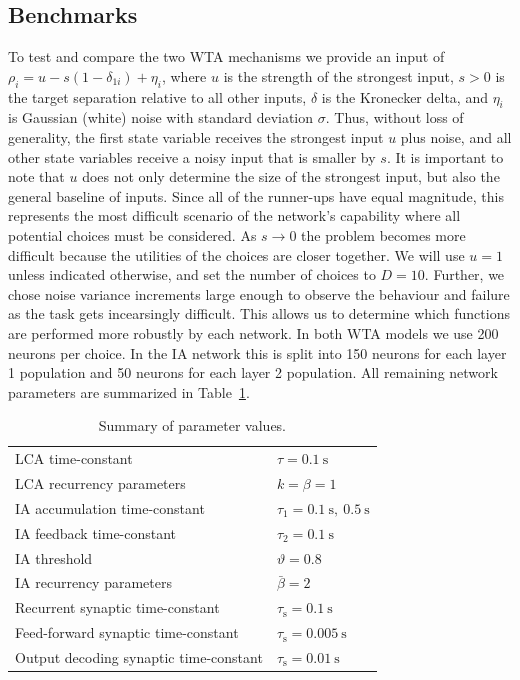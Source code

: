 \documentclass[10pt,letterpaper]{article}
\begin{document}
\subsection{Benchmarks}
To test and compare the two WTA mechanisms we provide an input of $\rho_i = u - s(1 - \delta_{1i}) + \eta_i$, where $u$ is the strength of the strongest input, 
$s > 0$ is the target separation relative to all other inputs, $\delta$ is the Kronecker delta, and $\eta_i$ is Gaussian (white) noise with standard deviation $\sigma$.
Thus, without loss of generality, the first state variable receives the strongest input $u$ plus noise, and all other state variables receive a noisy input that is smaller by $s$.
It is important to note that $u$ does not only determine the size of the strongest input, but also the general baseline of inputs.
Since all of the runner-ups have equal magnitude, this represents the most difficult scenario of the network's capability where all potential choices must be considered.
As $s \rightarrow 0$ the problem becomes more difficult because the utilities of the choices are closer together.
We will use $u = 1$ unless indicated otherwise, and set the number of choices to $D = 10$.
Further, we chose noise variance increments large enough to observe the behaviour and failure as the task gets incearsingly difficult.
This allows us to determine which functions are performed more robustly by each network.
In both WTA models we use 200 neurons per choice.
In the IA network this is split into 150 neurons for each layer 1 population and 50 neurons for each layer 2 population.
All remaining network parameters are summarized in Table~\ref{tbl:params}.
\begin{table}
    \caption{Summary of parameter values.}\label{tbl:params}
    \begin{tabular}{ll}
        LCA time-constant & $\tau = \SI{0.1}{\second}$ \\
        LCA recurrency parameters & $k = \beta = 1$ \\
        IA accumulation time-constant & $\tau_1 = \SI{0.1}{\second},\ \SI{0.5}{\second}$ \\
        IA feedback time-constant & $\tau_2 = \SI{0.1}{\second}$ \\
        IA threshold & $\vartheta = 0.8$ \\
        IA recurrency parameters & $\bar{\beta} = 2$ \\
        Recurrent synaptic time-constant & $\tau_{\mathrm{s}} 
        = \SI{0.1}{\second}$ \\
        Feed-forward synaptic time-constant & $\tau_{\mathrm{s}} 
        = \SI{0.005}{\second}$ \\
        Output decoding synaptic time-constant & $\tau_{\mathrm{s}} 
        = \SI{0.01}{\second}$
    \end{tabular}
\end{table}
\end{document}
